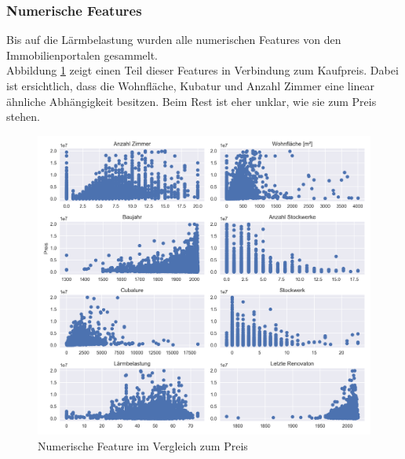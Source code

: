 \begin{table}[ht]
\centering
{}
\caption{Statistische Werte des Kaufpreises}
\label{tab:price}
\end{table}

\subsubsection{Numerische Features}
Bis auf die Lärmbelastung wurden alle numerischen Features von den Immobilienportalen gesammelt.\\
Abbildung \ref{fig:num_features} zeigt einen Teil dieser Features in Verbindung zum Kaufpreis. Dabei ist ersichtlich, dass die Wohnfläche, Kubatur und Anzahl Zimmer eine linear ähnliche Abhängigkeit besitzen. Beim Rest ist eher unklar, wie sie zum Preis stehen.

\begin{figure}[h]
\centering
\includegraphics[width=\textwidth]{images/Vergleich_zum_preis.png}
\caption[Numerische Feature im Vergleich zum Preis]{Numerische Feature im Vergleich zum Preis}%
\label{fig:num_features}
\end{figure}

